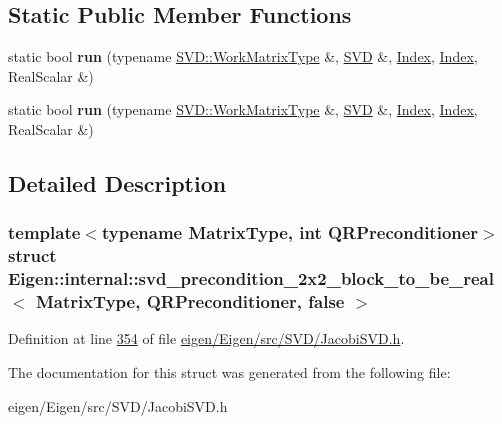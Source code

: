 \subsection*{Static Public Member Functions}
\begin{DoxyCompactItemize}
\item 
\mbox{\label{struct_eigen_1_1internal_1_1svd__precondition__2x2__block__to__be__real_3_01_matrix_type_00_01_q076cf26720930d18ea7d222bbee662fd_afde3f70cb5d0cf4bf15c8df8a36372f9}} 
static bool {\bfseries run} (typename \hyperlink{group___core___module}{S\+V\+D\+::\+Work\+Matrix\+Type} \&, \hyperlink{group___s_v_d___module_class_eigen_1_1_jacobi_s_v_d}{S\+VD} \&, \hyperlink{namespace_eigen_a62e77e0933482dafde8fe197d9a2cfde}{Index}, \hyperlink{namespace_eigen_a62e77e0933482dafde8fe197d9a2cfde}{Index}, Real\+Scalar \&)
\item 
\mbox{\label{struct_eigen_1_1internal_1_1svd__precondition__2x2__block__to__be__real_3_01_matrix_type_00_01_q076cf26720930d18ea7d222bbee662fd_afde3f70cb5d0cf4bf15c8df8a36372f9}} 
static bool {\bfseries run} (typename \hyperlink{group___core___module}{S\+V\+D\+::\+Work\+Matrix\+Type} \&, \hyperlink{group___s_v_d___module_class_eigen_1_1_jacobi_s_v_d}{S\+VD} \&, \hyperlink{namespace_eigen_a62e77e0933482dafde8fe197d9a2cfde}{Index}, \hyperlink{namespace_eigen_a62e77e0933482dafde8fe197d9a2cfde}{Index}, Real\+Scalar \&)
\end{DoxyCompactItemize}


\subsection{Detailed Description}
\subsubsection*{template$<$typename Matrix\+Type, int Q\+R\+Preconditioner$>$\newline
struct Eigen\+::internal\+::svd\+\_\+precondition\+\_\+2x2\+\_\+block\+\_\+to\+\_\+be\+\_\+real$<$ Matrix\+Type, Q\+R\+Preconditioner, false $>$}



Definition at line \hyperlink{eigen_2_eigen_2src_2_s_v_d_2_jacobi_s_v_d_8h_source_l00354}{354} of file \hyperlink{eigen_2_eigen_2src_2_s_v_d_2_jacobi_s_v_d_8h_source}{eigen/\+Eigen/src/\+S\+V\+D/\+Jacobi\+S\+V\+D.\+h}.



The documentation for this struct was generated from the following file\+:\begin{DoxyCompactItemize}
\item 
eigen/\+Eigen/src/\+S\+V\+D/\+Jacobi\+S\+V\+D.\+h\end{DoxyCompactItemize}
